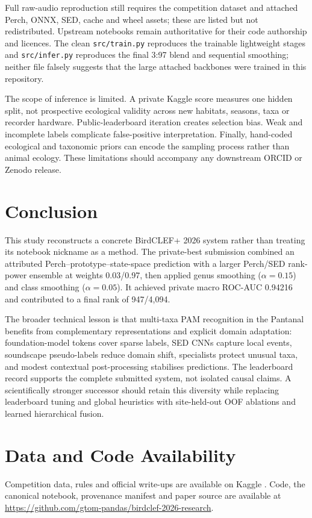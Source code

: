 \documentclass[10pt,a4paper]{article}
\begin{document}
Full raw-audio reproduction still requires the competition dataset and attached Perch, ONNX, SED, cache and wheel assets; these are listed but not redistributed. Upstream notebooks remain authoritative for their code authorship and licences. The clean \texttt{src/train.py} reproduces the trainable lightweight stages and \texttt{src/infer.py} reproduces the final 3:97 blend and sequential smoothing; neither file falsely suggests that the large attached backbones were trained in this repository.

The scope of inference is limited. A private Kaggle score measures one hidden split, not prospective ecological validity across new habitats, seasons, taxa or recorder hardware. Public-leaderboard iteration creates selection bias. Weak and incomplete labels complicate false-positive interpretation. Finally, hand-coded ecological and taxonomic priors can encode the sampling process rather than animal ecology. These limitations should accompany any downstream ORCID or Zenodo release.

\section{Conclusion}
This study reconstructs a concrete BirdCLEF+ 2026 system rather than treating its notebook nickname as a method. The private-best submission combined an attributed Perch--prototype--state-space prediction with a larger Perch/SED rank-power ensemble at weights 0.03/0.97, then applied genus smoothing ($\alpha=0.15$) and class smoothing ($\alpha=0.05$). It achieved private macro ROC-AUC 0.94216 and contributed to a final rank of 947/4,094.

The broader technical lesson is that multi-taxa PAM recognition in the Pantanal benefits from complementary representations and explicit domain adaptation: foundation-model tokens cover sparse labels, SED CNNs capture local events, soundscape pseudo-labels reduce domain shift, specialists protect unusual taxa, and modest contextual post-processing stabilises predictions. The leaderboard record supports the complete submitted system, not isolated causal claims. A scientifically stronger successor should retain this diversity while replacing leaderboard tuning and global heuristics with site-held-out OOF ablations and learned hierarchical fusion.

\section*{Data and Code Availability}
Competition data, rules and official write-ups are available on Kaggle \cite{kahl2026birdclef}. Code, the canonical notebook, provenance manifest and paper source are available at \url{https://github.com/gtom-pandas/birdclef-2026-research}.
\end{document}
